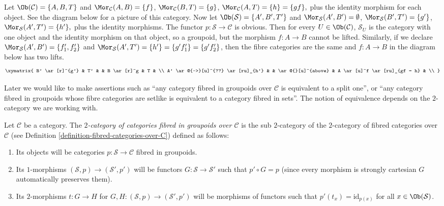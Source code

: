 \begin{example}
\label{example-not-fibred-in-groupoids-but-fibre-cats-are}
Let $\Ob(\mathcal{C}) = \{A, B, T\}$ and
$\Mor_\mathcal{C}(A, B) = \{f\}$, $\Mor_\mathcal{C}(B, T) = \{g\}$,
$\Mor_\mathcal{C}(A, T) = \{h\} = \{gf\}, $ plus the identity morphism
for each object. See the diagram below for a picture of this category. Now let
$\Ob(\mathcal{S}) = \{A', B', T'\}$ and
$\Mor_\mathcal{S}(A', B') = \emptyset$,
$\Mor_\mathcal{S}(B', T') = \{g'\}$,
$\Mor_\mathcal{S}(A', T') = \{h'\}, $ plus the identity morphisms. The
functor $p : \mathcal{S} \to \mathcal{C}$ is obvious. Then for every
$U \in \Ob(\mathcal{C})$, $\mathcal{S}_U$ is the category with one
object and the identity morphism on that object, so a groupoid, but the
morphism $f: A \to B$ cannot be lifted. Similarly, if we declare
$\Mor_\mathcal{S}(A', B') = \{f'_1, f'_2\}$ and
$ \Mor_\mathcal{S}(A', T') = \{h'\} = \{g'f'_1 \} = \{g'f'_2\}$, then
the fibre categories are the same and $f: A \to B$ in the diagram below has
two lifts.
$$
\xymatrix{
B' \ar[r]^{g'} & T' & & B \ar[r]^g & T & \\
A' \ar@{-->}[u]^{??} \ar[ru]_{h'} & & \ar@{}[u]^{above} &
A \ar[u]^f \ar[ru]_{gf = h} & \\
}
$$
\end{example}

\noindent
Later we would like to make assertions such as ``any category fibred in
groupoids over $\mathcal{C}$ is equivalent to a split one'', or
``any category fibred in groupoids whose fibre categories are setlike
is equivalent to a category fibred in sets''. The notion of equivalence
depends on the $2$-category we are working with.

\begin{definition}
\label{definition-categories-fibred-in-groupoids-over-C}
Let $\mathcal{C}$ be a category.
The {\it $2$-category of categories fibred in groupoids over $\mathcal{C}$}
is the sub $2$-category of the $2$-category of fibred categories
over $\mathcal{C}$ (see Definition \ref{definition-fibred-categories-over-C})
defined as follows:
\begin{enumerate}
\item Its objects will be categories
$p : \mathcal{S} \to \mathcal{C}$ fibred in groupoids.
\item Its $1$-morphisms $(\mathcal{S}, p) \to (\mathcal{S}', p')$
will be functors $G : \mathcal{S} \to \mathcal{S}'$ such that
$p' \circ G = p$ (since every morphism is strongly cartesian
$G$ automatically preserves them).
\item Its $2$-morphisms $t : G \to H$ for
$G, H : (\mathcal{S}, p) \to (\mathcal{S}', p')$
will be morphisms of functors
such that $p'(t_x) = \text{id}_{p(x)}$
for all $x \in \Ob(\mathcal{S})$.
\end{enumerate}
\end{definition}

